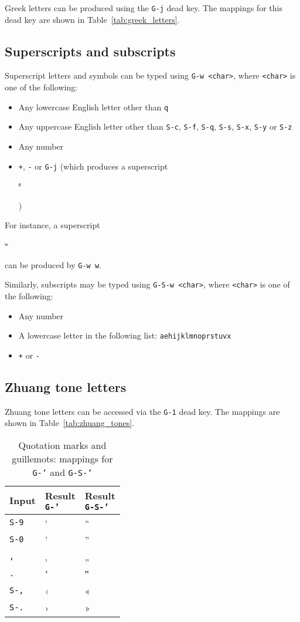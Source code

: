 \documentclass[oneside]{memoir}
\newcommand{\key}{\verb}
\newcommand{\keynv}{\texttt}
\newcommand{\out}[1]{\colorbox{gray!20}{\strut{}#1}}
\begin{document}
Greek letters can be produced using the \key|G-j| dead key.
The mappings for this dead key are shown in Table~\ref{tab:greek_letters}.

\subsection{Superscripts and subscripts}
\label{sec:superscripts-subscripts}

Superscript letters and symbols can be typed using \key|G-w <char>|, where \key|<char>| is one of the following:
\begin{itemize}[noitemsep]
\item Any lowercase English letter other than \key|q|
\item Any uppercase English letter other than \key|S-c|, \key|S-f|, \key|S-q|, \key|S-s|, \key|S-x|, \key|S-y| or \key|S-z|
\item Any number
\item \key|+|, \key|-| or \key|G-j| (which produces a superscript \out{ᶿ})
\end{itemize}
For instance, a superscript \out{ʷ} can be produced by \key|G-w w|.

Similarly, subscripts may be typed using \key|G-S-w <char>|, where \key|<char>| is one of the following:
\begin{itemize}[noitemsep]
\item Any number
\item A lowercase letter in the following list: \texttt{aehijklmnoprstuvx}
\item \key|+| or \key|-|
\end{itemize}

\subsection{Zhuang tone letters}
\label{sec:zhuang_tones}


Zhuang tone letters can be accessed via the \key|G-1| dead key.
The mappings are shown in Table~\ref{tab:zhuang_tones}.

\begin{table}[t]
\caption{Quotation marks and guillemots: mappings for \keynv{G-'} and \keynv{G-S-'}}
\label{tab:quotes_guillemots}
\centering
\begin{tabular}{lll}
\toprule
Input & \makecell{Result\\\keynv{G-'}} & \makecell{Result\\\keynv{G-S-'}} \\
\midrule
\key|S-9| & ‘ & “ \\
\key|S-0| & ’ & ” \\
\key|,|   & ‚ & „ \\
\key|.|   & ‛ & ‟ \\
\key|S-,| & ‹ & « \\
\key|S-.| & › & » \\
\bottomrule
\end{tabular}
\end{table}
\end{document}

